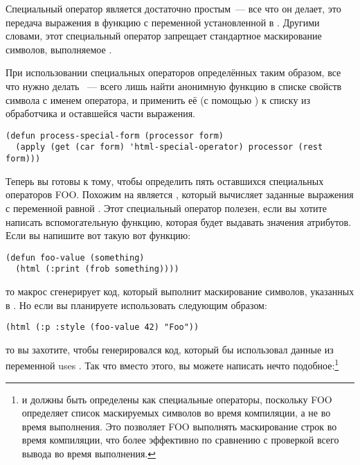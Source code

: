 Специальный оператор  является достаточно простым~--- все что он делает,
это передача выражения в функцию  с переменной 
установленной в .  Другими словами, этот специальный оператор запрещает
стандартное маскирование символов, выполняемое .

При использовании специальных операторов определённых таким образом, все что нужно делать
~--- всего лишь найти анонимную функцию в списке свойств символа
с именем оператора, и применить её (с помощью ) к списку из обработчика и
оставшейся части выражения.

\begin{lstlisting}
(defun process-special-form (processor form)
  (apply (get (car form) 'html-special-operator) processor (rest form)))
\end{lstlisting}

Теперь вы готовы к тому, чтобы определить пять оставшихся специальных операторов FOO.
Похожим на  является , который вычисляет заданные
выражения с переменной  равной .  Этот
специальный оператор полезен, если вы хотите написать вспомогательную функцию, которая
будет выдавать значения атрибутов.  Если вы напишите вот такую вот функцию:

\begin{lstlisting}
(defun foo-value (something)
  (html (:print (frob something))))
\end{lstlisting}

то макрос сгенерирует код, который выполнит маскирование символов, указанных в
.  Но если вы планируете использовать  следующим
образом:

\begin{lstlisting}
(html (:p :style (foo-value 42) "Foo"))
\end{lstlisting}

то вы захотите, чтобы генерировался код, который бы использовал данные из переменной uses
.  Так что вместо этого, вы можете написать нечто
подобное:\footnote{ и  должны быть определены как
  специальные операторы, поскольку FOO определяет список маскируемых символов во время
  компиляции, а не во время выполнения.  Это позволяет FOO выполнять маскирование строк во
  время компиляции, что более эффективно по сравнению с проверкой всего вывода во время
  выполнения.}

